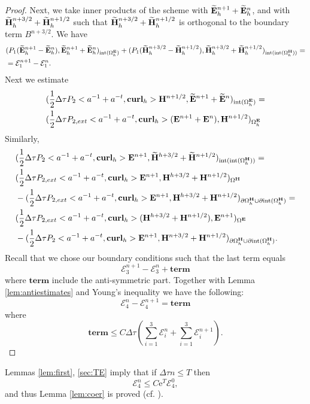 \documentclass[12pt,reqno]{amsart}
\newcommand{\curl}{{\bf curl}}
\newcommand{\e}{{\bf E}}
\newcommand{\h}{{\bf H}}
\theoremstyle{definition}
\numberwithin{equation}{section}
\newcommand{\intr}[1]{\mathrm{int}(#1)}
\def\Gw{\Omega}     \def\Gx{\Xi}         \def\Gy{\Psi}
\def\Gwh{\Omega_h}
\begin{document}
\begin{proof}
	
	Next, we take inner products of the scheme with $\widetilde{\e}_h^{n+1}+\widetilde{\e}_h^n$,
	and with 
	$\widetilde{\h}_h^{n+3/2}+\widetilde{\h}_h^{n+1/2}$ such that 
	$\widetilde{\h}_h^{n+3/2}+\widetilde{\h}_h^{n+1/2}$ is orthogonal to the boundary term $B^{n+3/2}$.
We have
	\begin{align*}
		&
		(P_1(\widetilde{\e}^{n+1}_h-\widetilde{\e}^{n}_h),\widetilde{\e}^{n+1}_h+\widetilde{\e}^{n}_h)_{\intr{\Gwh^\e}}+
		(P_1(\widetilde{\h}^{n+3/2}_h-\widetilde{\h}^{n+1/2}_h),\widetilde{\h}^{n+3/2}_h+\widetilde{\h}^{n+1/2}_h)_{\intr{\intr{\Gwh^\h}}}=\\&
		=\mathcal{E}_1^{n+1}-\mathcal{E}_1^{n}.
	\end{align*}
	Next we estimate
	\begin{align*}
		&
		(\frac{1}{2}\Delta \tau P_2<a^{-1}+a^{-t},\curl_h>\h^{n+1/2},\widetilde{\e}^{n+1}+\widetilde{\e}^{n})_{ \intr{\Gwh^\e}}=\\&
		(\frac{1}{2}\Delta \tau P_{2,ext}<a^{-1}+a^{-t},\curl_h>(\e^{n+1}+\e^{n}),\h^{n+1/2})_{ {\Gwh^\e}}
	\end{align*}
	Similarly,
	\begin{align*}
		&
		(\frac{1}{2}\Delta \tau P_2<a^{-1}+a^{-t},\curl_h>\e^{n+1},\widetilde{\h}^{h+3/2}+\widetilde{\h}^{n+1/2})_{\intr{\intr{\Gwh^\h}}}=\\&
		(\frac{1}{2}\Delta \tau P_{2,ext}<a^{-1}+a^{-t},\curl_h>\e^{n+1},\h^{h+3/2}+\h^{n+1/2})_{{\Gw^\h}}
		\\&
		-(\frac{1}{2}\Delta \tau P_{2,ext}<a^{-1}+a^{-t},\curl_h>\e^{n+1},\h^{h+3/2}+\h^{n+1/2})_{\partial{\Gwh^\h}\cup \partial \intr{\Gwh^\h}}=\\&
		(\frac{1}{2}\Delta \tau P_{2,ext}<a^{-1}+a^{-t},\curl_h>(\h^{h+3/2}+\h^{n+1/2}),\e^{n+1})_{{{\Gw^\e}}}
		\\&
		-(\frac{1}{2}\Delta \tau P_{2}<a^{-1}+a^{-t},\curl_h>\e^{n+1},\h^{n+3/2}+\h^{n+1/2})_{\partial{\Gwh^\h}\cup \partial \intr{\Gwh^\h}}.
	\end{align*}
	Recall that we chose our boundary conditions such that 
	the last term equals $$\mathcal{E}_3^{n+1}-\mathcal{E}_3^{n}+
	\mathbf{term}$$ where $\mathbf{term}$ include the anti-symmetric part.
	Together with Lemma \ref{lem:antiestimates} and Young's inequality we have the following:
		$$\mathcal{E}_4^n-
	\mathcal{E}_4^{n+1}=
	\mathbf{term}
		$$
		where 
		$$
		\mathbf{term}\leq C \Delta \tau( \sum_{i=1}^3\mathcal{E}_i^n+
		\sum_{i=1}^3\mathcal{E}_i^{n+1}).
		$$
\end{proof}
Lemmas \ref{lem:first}, \ref{sec:TE} imply that if $\Delta \tau n\leq T$
then 
$$
\mathcal{E}_4^{n}\leq C \mathrm{e}^{T}\mathcal{E}_4^{0},
$$
and thus Lemma \ref{lem:coer} is proved (cf. \cite[chapter 5]{GKO}).
	
\end{document}
